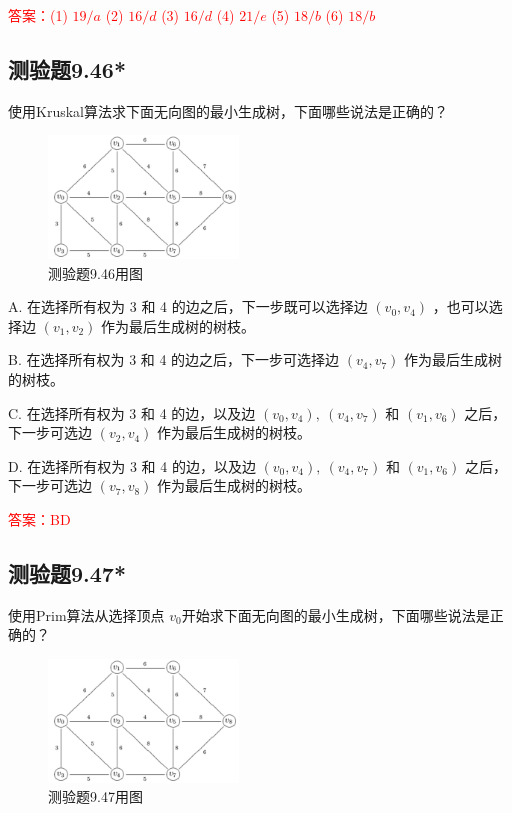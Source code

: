 \documentclass[UTF8, heading=true]{ctexart}
\begin{document}
\textcolor{red}{答案：(1) $19 / a$
(2) $16 / d$
(3) $16 / d$
(4) $21 / e$
(5) $18 / b$
(6) $18 / b$}

\subsection{测验题9.46*}

使用Kruskal算法求下面无向图的最小生成树，下面哪些说法是正确的？

\begin{figure}[H]
  \centering
  \includegraphics[width=0.45\textwidth]{9.46.jpg} %
  \caption{测验题9.46用图}
\end{figure}

A. 在选择所有权为 3 和 4 的边之后，下一步既可以选择边 $\left(v_0, v_4\right)$ ，也可以选择边 $\left(v_1, v_2\right)$ 作为最后生成树的树枝。

B. 在选择所有权为 3 和 4 的边之后，下一步可选择边 $\left(v_4, v_7\right)$ 作为最后生成树的树枝。

C. 在选择所有权为 3 和 4 的边，以及边 $\left(v_0, v_4\right), ~\left(v_4, v_7\right)$ 和 $\left(v_1, v_6\right)$ 之后，下一步可选边 $\left(v_2, v_4\right)$ 作为最后生成树的树枝。

D. 在选择所有权为 3 和 4 的边，以及边 $\left(v_0, v_4\right), ~\left(v_4, v_7\right)$ 和 $\left(v_1, v_6\right)$ 之后，下一步可选边 $\left(v_7, v_8\right)$ 作为最后生成树的树枝。

\textcolor{red}{答案：BD}

\subsection{测验题9.47*}

使用Prim算法从选择顶点 $v_0$开始求下面无向图的最小生成树，下面哪些说法是正确的？

\begin{figure}[H]
  \centering
  \includegraphics[width=0.45\textwidth]{9.46.jpg} %
  \caption{测验题9.47用图}
\end{figure}
\end{document}
